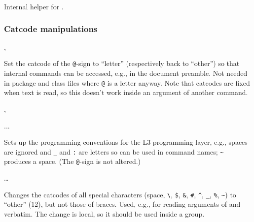 \documentclass{l3in2edoc}
\begin{document}
\begin{function}[int]
  {
    \@tf@r
  }
  Internal helper for .

\end{function}




\subsubsection{Catcode manipulations}


\begin{function}[user]
  {
    \makeatletter,
    \makeatother
  }
  \begin{syntax}
      
  \end{syntax}
  Set the catcode of the \texttt{@}-sign to \enquote{letter}
  (respectively back to \enquote{other}) so that internal \LaTeXe{}
  commands can be accessed, e.g., in the document preamble. Not
  needed in package and class files where \texttt{@} is a letter
  anyway. Note that catcodes are fixed when text is read, so this
  doesn't work inside an argument of another command.
\end{function}



\begin{function}[user]
  {
    \ExplSyntaxOn,
    \ExplSyntaxOff
  }
  \begin{syntax}
     ... 
  \end{syntax}
  Sets up the programming conventions for the L3 programming layer,
  e.g., spaces are ignored and \texttt{\_} and \texttt{:} are letters
  so can be used in command names; \texttt{\textasciitilde} produces
  a space. (The \texttt{@}-sign is not altered.)
\end{function}




\begin{function}[]
  {
    \@sanitize
  }
  \begin{syntax}
     \ldots{} 
  \end{syntax}
  Changes the catcodes of all special characters (space,
  \texttt{\textbackslash}, \texttt{\$}, \texttt{\&}, \texttt{\#},
  \texttt{\textasciicircum}, \texttt{\_}, \texttt{\%},
  \texttt{\textasciitilde}) to \enquote{other} (12), but not those of
  braces. Used, e.g., for reading arguments of  and
   verbatim. The change is local, so it should be used
  inside a group.
\end{function}
\end{document}
